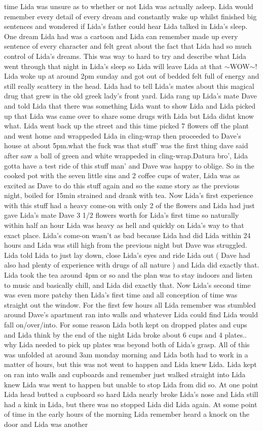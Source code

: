 \documentclass[12pt]{book}
\begin{document}
time Lida was unsure as to whether or not Lida was actually asleep. Lida would remember every detail of every dream and constantly wake up whilst finished big sentences and wondered if Lida's father could hear Lida talked in Lida's sleep. One dream Lida had was a cartoon and Lida can remember made up every sentence of every character and felt great about the fact that Lida had so much control of Lida's dreams. This was way to hard to try and describe what Lida went through that night in Lida's sleep so Lida will leave Lida at that $\sim$WOW$\sim$! Lida woke up at around 2pm sunday and got out of bedded felt full of energy and still really scattery in the head. Lida had to tell Lida's mates about this magical drug that grew in the old greek lady's front yard. Lida rang up Lida's mate Dave and told Lida that there was something Lida want to show Lida and Lida picked up that Lida was came over to share some drugs with Lida but Lida didnt know what. Lida went back up the street and this time picked 7 flowers off the plant and went home and wrappeded Lida in cling-wrap then proceeded to Dave's house at about 5pm.what the fuck was that stuff' was the first thing dave said after saw a ball of green and white wrappeded in cling-wrap.Datura bro', Lida gotta have a test ride of this stuff man' and Dave was happy to oblige. So in the cooked pot with the seven little sins and 2 coffee cups of water, Lida was as excited as Dave to do this stuff again and so the same story as the previous night, boiled for 15min strained and drank with tea. Now Lida's first experience with this stuff had a heavy come-on with only 2 of the flowers and Lida had just gave Lida's mate Dave 3 1/2 flowers worth for Lida's first time so naturally within half an hour Lida was heavy as hell and quickly on Lida's way to that exact place. Lida's come-on wasn't as bad because Lida had did Lida within 24 hours and Lida was still high from the previous night but Dave was struggled. Lida told Lida to just lay down, close Lida's eyes and ride Lida out ( Dave had also had plenty of experience with drugs of all nature ) and Lida did exactly that. Lida took the tea around 4pm or so and the plan was to stay indoors and listen to music and basically chill, and Lida did exactly that. Now Lida's second time was even more patchy then Lida's first time and all conception of time was straight out the window. For the first few hours all Lida remember was stumbled around Dave's apartment ran into walls and whatever Lida could find Lida would fall on/over/into. For some reason Lida both kept on dropped plates and cups and Lida think by the end of the night Lida broke about 6 cups and 4 plates.. why Lida needed to pick up plates was beyond both of Lida's grasp. All of this was unfolded at around 3am monday morning and Lida both had to work in a matter of hours, but this was not went to happen and Lida knew Lida. Lida kept on ran into walls and cupboards and remember just walked straight into Lida knew Lida was went to happen but unable to stop Lida from did so. At one point Lida head butted a cupboard so hard Lida nearly broke Lida's nose and Lida still had a kink in Lida, but there was no stopped Lida did Lida again. At some point of time in the early hours of the morning Lida remember heard a knock on the door and Lida was another 
\end{document}
